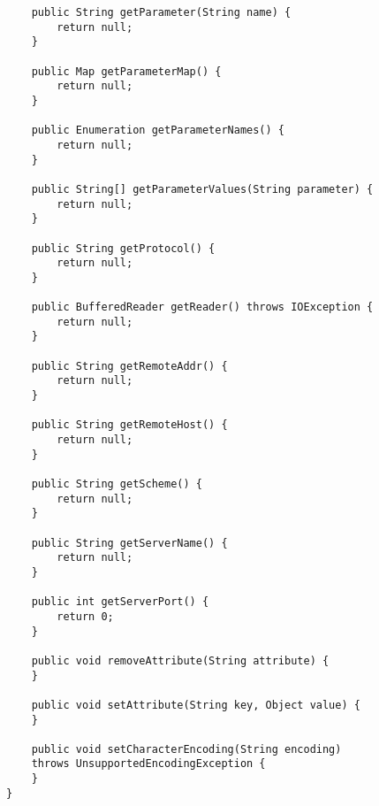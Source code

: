 \begin{lstlisting}
	public String getParameter(String name) {
		return null;
	}
	
	public Map getParameterMap() {
		return null;
	}
	
	public Enumeration getParameterNames() {
		return null;
	}
	
	public String[] getParameterValues(String parameter) {
		return null;
	}
	
	public String getProtocol() {
		return null;
	}
	
	public BufferedReader getReader() throws IOException {
		return null;
	}
	
	public String getRemoteAddr() {
		return null;
	}
	
	public String getRemoteHost() {
		return null;
	}
	
	public String getScheme() {
		return null;
	}
	
	public String getServerName() {
		return null;
	}
	
	public int getServerPort() {
		return 0;
	}
	
	public void removeAttribute(String attribute) {
	}
	
	public void setAttribute(String key, Object value) {
	}
	
	public void setCharacterEncoding(String encoding)
	throws UnsupportedEncodingException {
	}
}
\end{lstlisting}
